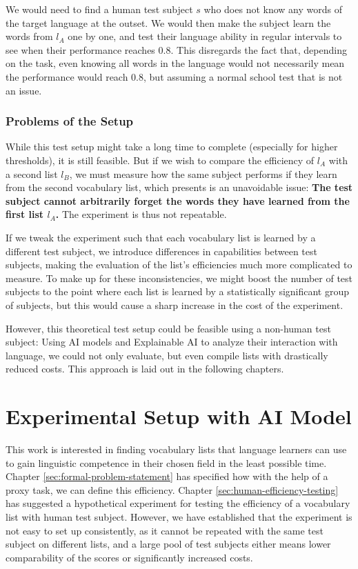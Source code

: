 We would need to find a human test subject $s$ who does not know any words of the target language at the outset.
We would then make the subject learn the words from $l_A$ one by one, and test their language ability in regular intervals to see when their performance reaches $0.8$.
This disregards the fact that, depending on the task, even knowing all words in the language would not necessarily mean the performance would reach 0.8, but assuming a normal school test that is not an issue.

\subsubsection{Problems of the Setup}
While this test setup might take a long time to complete (especially for higher thresholds), it is still feasible.
But if we wish to compare the efficiency of $l_A$ with a second list $l_B$, we must measure how the same subject performs if they learn from the second vocabulary list, which presents is an unavoidable issue:
\textbf{The test subject cannot arbitrarily forget the words they have learned from the first list $l_A$.}
The experiment is thus not repeatable.

If we tweak the experiment such that each vocabulary list is learned by a different test subject, we introduce differences in capabilities between test subjects, making the evaluation of the list's efficiencies much more complicated to measure.
To make up for these inconsistencies, we might boost the number of test subjects to the point where each list is learned by a statistically significant group of subjects, but this would cause a sharp increase in the cost of the experiment.

However, this theoretical test setup could be feasible using a non-human test subject:
Using AI models and Explainable AI to analyze their interaction with language, we could not only evaluate, but even compile lists with drastically reduced costs.
This approach is laid out in the following chapters.

\section{Experimental Setup with AI Model} \label{sec:experimental-setup-with-ai}

This work is interested in finding vocabulary lists that language learners can use to gain linguistic competence in their chosen field in the least possible time.
Chapter \ref{sec:formal-problem-statement} has specified how with the help of a proxy task, we can define this efficiency.
Chapter \ref{sec:human-efficiency-testing} has suggested a hypothetical experiment for testing the efficiency of a vocabulary list with human test subject.
However, we have established that the experiment is not easy to set up consistently, as it cannot be repeated with the same test subject on different lists, and a large pool of test subjects either means lower comparability of the scores or significantly increased costs.

